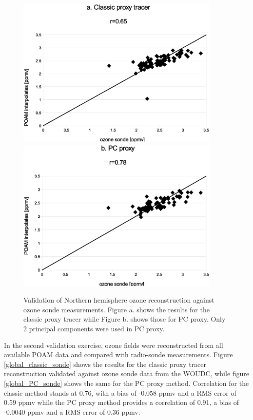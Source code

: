\documentclass{article}
\begin{document}
\begin{figure}
  \centering
  \includegraphics[width=0.9\textwidth]{Nhemi_classic_sonde}
  \includegraphics[width=0.9\textwidth]{Nhemi_PC_sonde}
  \caption{Validation of Northern hemisphere ozone reconstruction against ozone sonde measurements. 
  Figure a. shows the results for the classic proxy tracer while Figure b. shows those for PC proxy.
  Only 2 principal components were used in PC proxy.}
  \label{Nhemi_sonde}
\end{figure}

In the second validation exercise, ozone fields were reconstructed from 
all available POAM data and compared with radio-sonde measurements.
Figure \ref{global_classic_sonde} shows the results for the classic proxy
tracer reconstruction validated against ozone sonde data from the WOUDC,
while figure \ref{global_PC_sonde} shows the same for the PC proxy method.
Correlation for the classic method stands at 0.76, with a bias of -0.058 ppmv
and a RMS error of 0.59 ppmv while the PC proxy method provides a correlation
of 0.91, a bias of -0.0040 ppmv and a RMS error of 0.36 ppmv.
\end{document}
